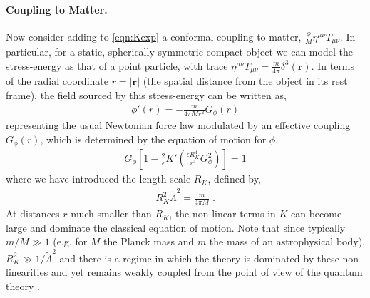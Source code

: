 \documentclass[11pt]{article}
\newcommand{\LambdaP}{\tilde{\Lambda}}
\begin{document}
\paragraph{Coupling to Matter.}
Now consider adding to \eqref{eqn:Kexp} a conformal coupling to matter, $\frac{ \phi }{ M } \eta^{\mu\nu} T_{\mu\nu}$. In particular, for a static, spherically symmetric compact object we can model the stress-energy as that of a point particle, with trace $\eta^{\mu\nu} T_{\mu\nu} = \frac{m}{4 \pi} \delta^3 \left( \mathbf{r} \right) $. 
In terms of the radial coordinate $r = |\mathbf{r}|$ (the spatial distance from the object in its rest frame), the field sourced by this stress-energy can be written as,
\begin{align}
 \phi' (r) = - \frac{m}{4 \pi M r^2} G_\phi (r)
 \label{eqn:Gphi_def}
\end{align}
representing the usual Newtonian force law modulated by an effective coupling $G_\phi (r)$, which is determined by the equation of motion for $\phi$,
\begin{align}
 G_\phi \left[ 1  -  \frac{2}{\epsilon} K'  \left(   \tfrac{ \epsilon R_K^4 }{ r^4 } G_\phi^2  \right) \right]   =   1 
\label{eqn:KGphi}
\end{align} 
where we have introduced the length scale $R_K$, defined by,
\begin{align}
 R_K^2 \LambdaP^2 = \frac{m}{4 \pi M} \; .
 \label{eqn:Rstar}
\end{align}
At distances  $r$ much smaller than $R_K$, the non-linear terms in $K$ can become large and dominate the classical equation of motion. 
Note that since typically $m / M \gg 1$ (e.g. for $M$ the Planck mass and $m$ the mass of an astrophysical body), $R_K^2 \gg 1/\LambdaP^2 $ and there is a regime in which the theory is dominated by these non-linearities and yet remains weakly coupled from the point of view of the quantum theory \cite{deRham:2014wfa}. 


\end{document}
